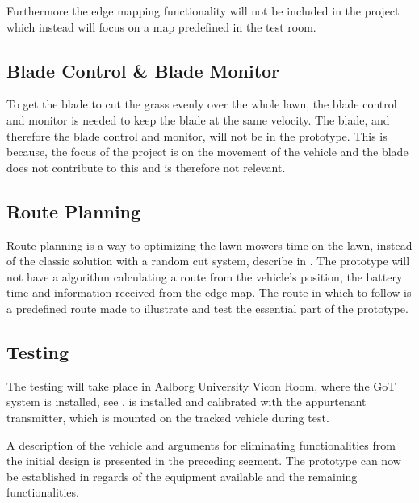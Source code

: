 Furthermore the edge mapping functionality will not be included in the project which instead will focus on a map predefined in the test room.


\subsection{Blade Control \& Blade Monitor}
To get the blade to cut the grass evenly over the whole lawn, the blade control and monitor is needed to keep the blade at the same velocity.
The blade, and therefore the blade control and monitor, will not be in the prototype. This is because, the focus of the project is on the movement of the vehicle and the blade does not contribute to this and is therefore not relevant.

\subsection{Route Planning}
Route planning is a way to optimizing the lawn mowers time on the lawn, instead of the classic solution with a random cut system, describe in . The prototype will not have a algorithm calculating a route from the vehicle's position, the battery time and information received from the edge map. The route in which to follow is a predefined route made to illustrate and test the essential part of the prototype.

\subsection{Testing}
The testing will take place in Aalborg University Vicon Room, where the GoT system is installed, see , is installed and calibrated with the appurtenant transmitter, which is mounted on the tracked vehicle during test.

A description of the vehicle and arguments for eliminating functionalities from the initial design is presented in the preceding segment. The prototype can now be established in regards of the equipment available and the remaining functionalities.
